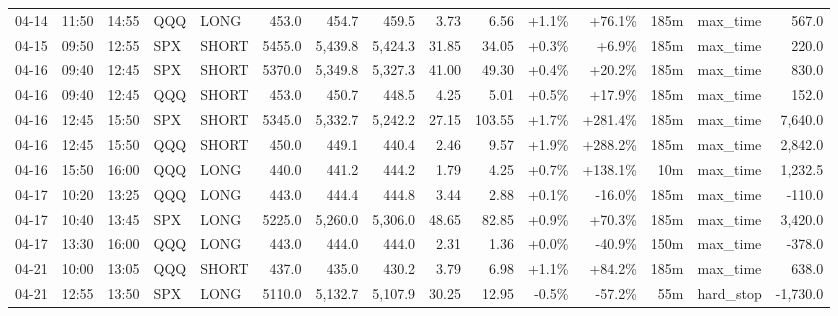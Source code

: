 \documentclass[11pt,a4paper,twoside]{article}
\begin{document}
\begin{landscape}
\begin{center}
\begin{longtable}{>{\color{txtmain}}l l l l l r r r r r r r r >{\color{txtmain}}l r}
04-14 & 11:50 & 14:55 & QQQ & LONG & 453.0 & 454.7 & 459.5 & 3.73 & 6.56 & \textcolor{wingreen}{+1.1\%} & \textcolor{wingreen}{+76.1\%} & 185m & max\_time & \textcolor{wingreen}{567.0} \\
04-15 & 09:50 & 12:55 & SPX & SHORT & 5455.0 & 5,439.8 & 5,424.3 & 31.85 & 34.05 & \textcolor{wingreen}{+0.3\%} & \textcolor{wingreen}{+6.9\%} & 185m & max\_time & \textcolor{wingreen}{220.0} \\
04-16 & 09:40 & 12:45 & SPX & SHORT & 5370.0 & 5,349.8 & 5,327.3 & 41.00 & 49.30 & \textcolor{wingreen}{+0.4\%} & \textcolor{wingreen}{+20.2\%} & 185m & max\_time & \textcolor{wingreen}{830.0} \\
04-16 & 09:40 & 12:45 & QQQ & SHORT & 453.0 & 450.7 & 448.5 & 4.25 & 5.01 & \textcolor{wingreen}{+0.5\%} & \textcolor{wingreen}{+17.9\%} & 185m & max\_time & \textcolor{wingreen}{152.0} \\
04-16 & 12:45 & 15:50 & SPX & SHORT & 5345.0 & 5,332.7 & 5,242.2 & 27.15 & 103.55 & \textcolor{wingreen}{+1.7\%} & \textcolor{wingreen}{+281.4\%} & 185m & max\_time & \textcolor{wingreen}{7,640.0} \\
04-16 & 12:45 & 15:50 & QQQ & SHORT & 450.0 & 449.1 & 440.4 & 2.46 & 9.57 & \textcolor{wingreen}{+1.9\%} & \textcolor{wingreen}{+288.2\%} & 185m & max\_time & \textcolor{wingreen}{2,842.0} \\
04-16 & 15:50 & 16:00 & QQQ & LONG & 440.0 & 441.2 & 444.2 & 1.79 & 4.25 & \textcolor{wingreen}{+0.7\%} & \textcolor{wingreen}{+138.1\%} & 10m & max\_time & \textcolor{wingreen}{1,232.5} \\
04-17 & 10:20 & 13:25 & QQQ & LONG & 443.0 & 444.4 & 444.8 & 3.44 & 2.88 & \textcolor{wingreen}{+0.1\%} & \textcolor{lossred}{-16.0\%} & 185m & max\_time & \textcolor{lossred}{-110.0} \\
04-17 & 10:40 & 13:45 & SPX & LONG & 5225.0 & 5,260.0 & 5,306.0 & 48.65 & 82.85 & \textcolor{wingreen}{+0.9\%} & \textcolor{wingreen}{+70.3\%} & 185m & max\_time & \textcolor{wingreen}{3,420.0} \\
04-17 & 13:30 & 16:00 & QQQ & LONG & 443.0 & 444.0 & 444.0 & 2.31 & 1.36 & \textcolor{wingreen}{+0.0\%} & \textcolor{lossred}{-40.9\%} & 150m & max\_time & \textcolor{lossred}{-378.0} \\
04-21 & 10:00 & 13:05 & QQQ & SHORT & 437.0 & 435.0 & 430.2 & 3.79 & 6.98 & \textcolor{wingreen}{+1.1\%} & \textcolor{wingreen}{+84.2\%} & 185m & max\_time & \textcolor{wingreen}{638.0} \\
04-21 & 12:55 & 13:50 & SPX & LONG & 5110.0 & 5,132.7 & 5,107.9 & 30.25 & 12.95 & \textcolor{lossred}{-0.5\%} & \textcolor{lossred}{-57.2\%} & 55m & hard\_stop & \textcolor{lossred}{-1,730.0} \\

\end{longtable}
\end{center}
\end{landscape}
\end{document}
